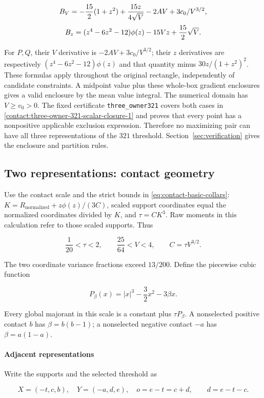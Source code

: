 \[
 B_V=-{15\over2}(1+z^2)+{15z\over4\sqrt V}-2AV+3c_0/V^{3/2},
\]
\[
 B_z=(z^4-6z^2-12)\phi(z)-15Vz+{15\over2}\sqrt V.
\]

For $P,Q$, their $V$ derivative is $-2AV+3c_0/V^{3/2}$; their $z$
derivatives are respectively $(z^4-6z^2-12)\phi(z)$ and that quantity
minus $30z/(1+z^2)^2$. These formulas apply throughout the original
rectangle, independently of candidate constraints. A midpoint value plus
these whole-box gradient enclosures gives a valid enclosure by the mean
value integral. The numerical domain has $V\ge v_0>0$.
The fixed certificate \texttt{three\_owner321} covers both cases in
\eqref{contact:three-owner-321-scalar-closure-1} and proves that every
point has a nonpositive applicable exclusion expression. Therefore
no maximizing pair can have all three representations of the $321$
threshold. Section~\ref{sec:verification} gives the enclosure and
partition rules.

\subsection{Two representations: contact geometry}\label{contact:two-owner-321-contact-reduction}


Use the contact scale and the strict bounds in
\eqref{eq:contact-basic-collars}:
$K=R_{\mathrm{normalized}}+z \phi(z)/(3C)$, scaled support coordinates equal the
normalized coordinates divided by $K$, and $\tau=C K^3$. Raw moments in
this calculation refer to those scaled supports. Thus

\[
 \frac1{20}<\tau<2,\qquad \frac{25}{64}<V<4,
 \qquad C=\tau V^{3/2}.
\tag{B.28.1}\label{contact:two-owner-321-contact-reduction-1}
\]

The two coordinate variance fractions exceed $13/200$. Define the piecewise cubic
function

\[
 P_\beta(x)=|x|^3-\frac32x^2-3\beta x.
\]

Every global majorant in this scale is a constant plus
$\tau P_\beta$. A nonselected positive contact $b$ has $\beta=b(b-1)$; a
nonselected negative contact $-a$ has $\beta=a(1-a)$.

\paragraph{Adjacent representations}

Write the supports and the selected threshold as

\[
 X=(-t,c,b),\quad Y=(-a,d,e),\quad
 o=e-t=c+d,\qquad d=e-t-c.
\tag{B.28.2}\label{contact:two-owner-321-contact-reduction-2}
\]

